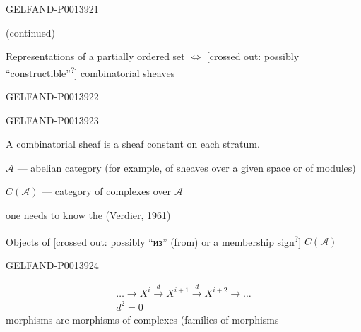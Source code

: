\begin{GelfandAdjacentEvidence}{GELFAND-P001392}{1}

\quad {} (continued)

Representations of a partially ordered set \(\Longleftrightarrow\)
[crossed out: possibly “constructible”\textsuperscript{?}]
combinatorial sheaves

\end{GelfandAdjacentEvidence}
\begin{GelfandAdjacentEvidence}{GELFAND-P001392}{2}



\end{GelfandAdjacentEvidence}
\begin{GelfandAdjacentEvidence}{GELFAND-P001392}{3}


A combinatorial sheaf is a sheaf constant on each stratum.


\(\mathcal A\) --- abelian category (for example, of sheaves over a given space or of modules)

\(C(\mathcal A)\) --- category of complexes over \(\mathcal A\)

one needs to know the  (Verdier, 1961)

Objects of [crossed out:
possibly “из” (from) or a membership sign\textsuperscript{?}]
\(C(\mathcal A)\)


\end{GelfandAdjacentEvidence}
\begin{GelfandAdjacentEvidence}{GELFAND-P001392}{4}

\begin{gather*}
\ldots\longrightarrow X^i\overset{d}{\longrightarrow}X^{i+1}
\overset{d}{\longrightarrow}X^{i+2}\longrightarrow\ldots\\
d^2=0
\end{gather*}
morphisms are morphisms of complexes (families of morphisms
\end{GelfandAdjacentEvidence}
